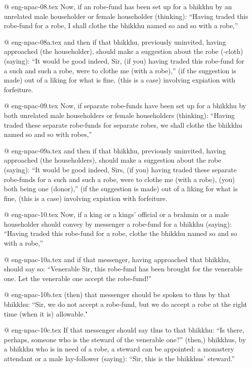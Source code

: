 @ eng-npac-08.tex
Now, if an robe-fund has been set up for a bhikkhu by an unrelated male householder or female householder (thinking): “Having traded this robe-fund for a robe, I shall clothe the bhikkhu named so and so with a robe,”

@ eng-npac-08a.tex
and then if that bhikkhu, previously uninvited, having approached (the householder), should make a suggestion about the robe (-cloth) (saying): “It would be good indeed, Sir, (if you) having traded this robe-fund for a such and such a robe, were to clothe me (with a robe),” (if the suggestion is made) out of a liking for what is fine, (this is a case) involving expiation with forfeiture.

@ eng-npac-09.tex
Now, if separate robe-funds have been set up for a bhikkhu by both unrelated male householders or female householders (thinking): “Having traded these separate robe-funds for separate robes, we shall clothe the bhikkhu named so and so with robes,”

@ eng-npac-09a.tex
and then if that bhikkhu, previously uninvited, having approached (the householders), should make a suggestion about the robe (saying): “It would be good indeed, Sirs, (if you) having traded these separate robe-funds for a such and such a robe, were to clothe me (with a robe), (you) both being one (donor),” (if the suggestion is made) out of a liking for what is fine, (this is a case) involving expiation with forfeiture.

@ eng-npac-10.tex
Now, if a king or a kings’ official or a brahmin or a male householder should convey by messenger a robe-fund for a bhikkhu (saying): “Having traded this robe-fund for a robe, clothe the bhikkhu named so and so with a robe,”

@ eng-npac-10a.tex
and if that messenger, having approached that bhikkhu, should say so: “Venerable Sir, this robe-fund has been brought for the venerable one. Let the venerable one accept the robe-fund!”

@ eng-npac-10b.tex
(then) that messenger should be spoken to thus by that bhikkhu: “Sir, we do not accept a robe-fund, but we do accept a robe at the right time (when it is) allowable."

@ eng-npac-10c.tex
If that messenger should say thus to that bhikkhu: “Is there, perhaps, someone who is the steward of the venerable one?” (then,) bhikkhus, by a bhikkhu who is in need of a robe, a steward can be appointed: a monastery attendant or a male lay-follower (saying): “Sir, this is the bhikkhus' steward.”

